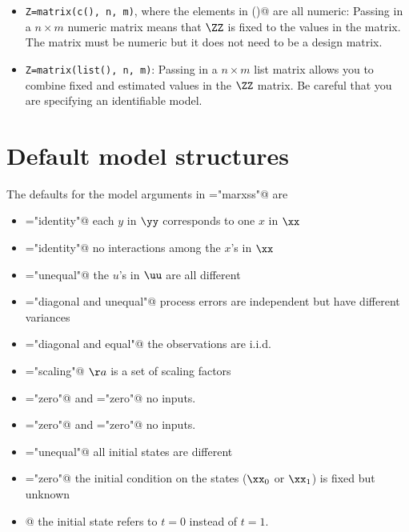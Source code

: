 \begin{itemize}
\item[] \texttt{Z=matrix(c(), n, m)}, where the elements in \verb@c()@ are all numeric:  Passing in a $n \times m$ numeric matrix means that $\ZZ$ is fixed to the values in the matrix. The matrix must be numeric but it does not need to be a design matrix.

\item[] \texttt{Z=matrix(list(), n, m)}:  Passing in a $n \times m$ list matrix allows you to combine fixed and estimated values in the $\ZZ$ matrix.  Be careful that you are specifying an identifiable model.

\end{itemize}

\section{Default model structures}
 The defaults for the model arguments in \verb@form="marxss"@ are
\begin{itemize}
\item[] \verb@Z="identity"@ each $y$ in $\yy$ corresponds to one $x$ in $\xx$
\item[] \verb@B="identity"@ no interactions among the $x$'s in $\xx$
\item[] \verb@U="unequal"@ the $u$'s in $\uu$ are all different
\item[] \verb@Q="diagonal and unequal"@ process errors are independent but have different variances
\item[] \verb@R="diagonal and equal"@ the observations are i.i.d.
\item[] \verb@A="scaling"@ $\aa$ is a set of scaling factors
\item[] \verb@C="zero"@ and \verb@D="zero"@ no inputs.
\item[] \verb@c="zero"@ and \verb@d="zero"@ no inputs.
\item[] \verb@pi="unequal"@ all initial states are different
\item[] ="zero"@ the initial condition on the states ($\xx_0$ or $\xx_1$) is fixed but unknown
\item[] @ the initial state refers to $t=0$ instead of $t=1$.
\end{itemize}
